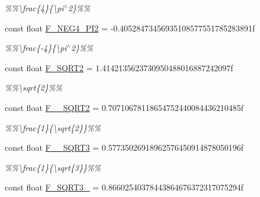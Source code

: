 \begin{DoxyCompactItemize}
\begin{DoxyCompactList}\small\item\em \%\%\textbackslash{}frac\{4\}\{\textbackslash{}pi$^\wedge$2\}\%\% \end{DoxyCompactList}\item 
\hypertarget{group___scalar_math_consts_ga6ec302fb2e7b4cfb615300db5bc4f271}{}const float \hyperlink{group___scalar_math_consts_ga6ec302fb2e7b4cfb615300db5bc4f271}{F\+\_\+\+N\+E\+G4\+\_\+\+P\+I2} = -\/0.\+40528473456935108577551785283891f\label{group___scalar_math_consts_ga6ec302fb2e7b4cfb615300db5bc4f271}

\begin{DoxyCompactList}\small\item\em \%\%\textbackslash{}frac\{-\/4\}\{\textbackslash{}pi$^\wedge$2\}\%\% \end{DoxyCompactList}\item 
\hypertarget{group___scalar_math_consts_gad425f5da9daf66a4bf041bf10752f52f}{}const float \hyperlink{group___scalar_math_consts_gad425f5da9daf66a4bf041bf10752f52f}{F\+\_\+\+S\+Q\+R\+T2} = 1.\+4142135623730950488016887242097f\label{group___scalar_math_consts_gad425f5da9daf66a4bf041bf10752f52f}

\begin{DoxyCompactList}\small\item\em \%\%\textbackslash{}sqrt\{2\}\%\% \end{DoxyCompactList}\item 
\hypertarget{group___scalar_math_consts_gaf5e286a6a93e2ea1dc623acbcbcc8159}{}const float \hyperlink{group___scalar_math_consts_gaf5e286a6a93e2ea1dc623acbcbcc8159}{F\+\_\+\_\+\+S\+Q\+R\+T2} = 0.\+70710678118654752440084436210485f\label{group___scalar_math_consts_gaf5e286a6a93e2ea1dc623acbcbcc8159}

\begin{DoxyCompactList}\small\item\em \%\%\textbackslash{}frac\{1\}\{\textbackslash{}sqrt\{2\}\}\%\% \end{DoxyCompactList}\item 
\hypertarget{group___scalar_math_consts_gaeb8c2298593ed612e5ad6d69bfa0bcd6}{}const float \hyperlink{group___scalar_math_consts_gaeb8c2298593ed612e5ad6d69bfa0bcd6}{F\+\_\+\_\+\+S\+Q\+R\+T3} = 0.\+57735026918962576450914878050196f\label{group___scalar_math_consts_gaeb8c2298593ed612e5ad6d69bfa0bcd6}

\begin{DoxyCompactList}\small\item\em \%\%\textbackslash{}frac\{1\}\{\textbackslash{}sqrt\{3\}\}\%\% \end{DoxyCompactList}\item 
\hypertarget{group___scalar_math_consts_gaf63dd491939d577dc0d1d1f1989341bb}{}const float \hyperlink{group___scalar_math_consts_gaf63dd491939d577dc0d1d1f1989341bb}{F\+\_\+\+S\+Q\+R\+T3\+\_} = 0.\+86602540378443864676372317075294f\label{group___scalar_math_consts_gaf63dd491939d577dc0d1d1f1989341bb}


\end{DoxyCompactItemize}
